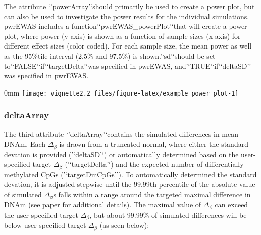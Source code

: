 \documentclass[]{article}
\newcommand{\hlcom}[1]{\textcolor[rgb]{0.502,0.502,0.502}{\textit{#1}}}%
\newcommand{\hlstd}[1]{\textcolor[rgb]{0.251,0.251,0.251}{#1}}%
\newcommand{\hlkwc}[1]{\textcolor[rgb]{0.251,0.251,0.251}{#1}}%
\newcommand{\hlkwd}[1]{\textcolor[rgb]{0.878,0.439,0.125}{#1}}%
\newenvironment{Shaded}{\begin{myshaded}}{\end{myshaded}}
\newcommand{\KeywordTok}[1]{\hlkwd{#1}}
\newcommand{\DataTypeTok}[1]{\hlkwc{#1}}
\newcommand{\CommentTok}[1]{\hlcom{#1}}
\newcommand{\OtherTok}[1]{{#1}}
\newcommand{\NormalTok}[1]{\hlstd{#1}}
\begin{document}
The attribute `'powerArray'`should primarily be used to create a power
plot, but can also be used to investigate the power results for the
individual simulations. pwrEWAS includes a
function'`pwrEWAS\_powerPlot'`that will create a power plot, where power
(y-axis) is shown as a function of sample sizes (x-axis) for different
effect sizes (color coded). For each sample size, the mean power as well
as the 95\%tile interval (2.5\% and 97.5\%) is shown.'`sd'`should be set
to'`FALSE'`if'`targetDelta'`was specified in pwrEWAS,
and'`TRUE'`if'`deltaSD'' was specified in pwrEWAS.

\begin{Shaded}
\end{Shaded}

\begin{adjustwidth}{\fltoffset}{0mm}
\texttt{[image: vignette2.2\_files/figure-latex/example power plot-1]} \end{adjustwidth}

\subsubsection{deltaArray}\label{deltaarray}

The third attribute `'deltaArray'`contains the simulated differences in
mean DNAm. Each \(\Delta_\beta\) is drawn from a truncated normal, where
either the standard devation is provided ('`deltaSD'`) or automatically
determined based on the user-specified target \(\Delta_\beta\)
('`targetDelta'`) and the expected number of differentially methylated
CpGs ('`targetDmCpGs''). To automatically determined the standard
devation, it is adjusted stepwise until the 99.99th percentile of the
absolute value of simulated \(\Delta_\beta\)s falls within a range
around the targeted maximal difference in DNAm (see paper for additional
details). The maximal value of \(\Delta_\beta\) can exceed the
user-specified target \(\Delta_\beta\), but about 99.99\% of simulated
differences will be below user-specified target \(\Delta_\beta\) (as
seen below):
\end{document}
